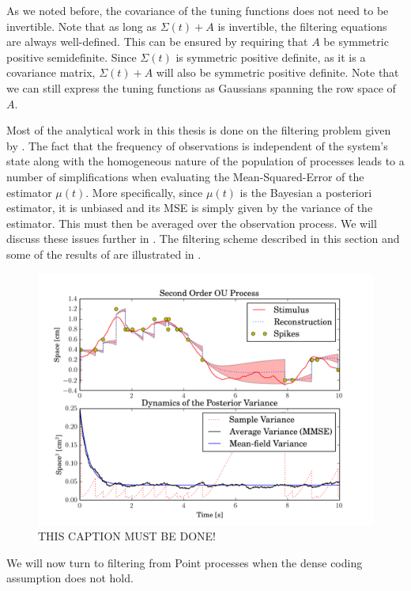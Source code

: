As we noted before, the covariance of the tuning functions does not need to be invertible. Note that as long as $\Sigma(t) + A$ is invertible, the filtering equations are always well-defined. This can be ensured by requiring that $A$ be symmetric positive semidefinite. Since $\Sigma(t)$ is symmetric positive definite, as it is a covariance matrix, $\Sigma(t)+A$ will also be symmetric positive definite. Note that we can still express the tuning functions as Gaussians spanning the row space of $A$.\par
Most of the analytical work in this thesis is done on the filtering problem given by . The fact that the frequency of observations is independent of the system's state along with the homogeneous nature of the population of processes leads to a number of simplifications when evaluating the Mean-Squared-Error of the estimator $\mu(t)$. More specifically, since $\mu(t)$ is the Bayesian a posteriori estimator, it is unbiased and its MSE is simply given by the variance of the estimator. This must then be averaged over the observation process. We will discuss these issues further in . The filtering scheme described in this section and some of the results of  are illustrated in .
\begin{figure}
\label{fig:matern_coding}
\includegraphics[width=\columnwidth]{figures/matern_coding.png}
\caption{THIS CAPTION MUST BE DONE!}
\end{figure}

We will now turn to filtering from Point processes when the dense coding assumption does not hold.

